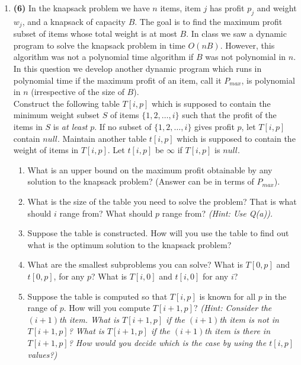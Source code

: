 \documentclass[10pt]{article}
\begin{document}
\begin{enumerate}
\item {\bf (6)}
In the knapsack problem we have $n$ items, item $j$ has profit $p_j$ and weight $w_j$, and a knapsack of capacity $B$.
The goal is to find the maximum profit subset of items whose total weight is at most $B$.
In class we saw a dynamic program to solve the knapsack problem in time $O(nB)$. 
However, this algorithm was not a polynomial time algorithm if $B$ was not polynomial in $n$.
In this question we develop another dynamic program which runs in polynomial time if the maximum profit of an item, call it $P_{max}$, is polynomial in $n$ (irrespective of the size of $B$).\\

Construct the following table $T[i,p]$ which is supposed to contain the minimum weight subset $S$ of items $\{1,2,\ldots,i\}$ such that
the profit of the items in $S$ is {\em at least} $p$. If no subset of $\{1,2,\ldots,i\}$ gives profit $p$, let $T[i,p]$ contain $null$.
Maintain another table $t[i,p]$ which is supposed to contain the weight of items in $T[i,p]$. Let $t[i,p]$ be $\infty$ if $T[i,p]$ is $null$.

	\begin{enumerate}
	\item What is an upper bound on the maximum profit obtainable by any solution to the knapsack problem? (Answer can be
		in terms of $P_{max}$).
	\item What is the size of the table you need to solve the problem? That is what should $i$ range from? What should $p$ range from?
	         {\em (Hint: Use Q(a)).}
	\item Suppose the table is constructed. How will you use the table to find out what is the optimum solution to the knapsack problem?
	\item What are the smallest subproblems you can solve? What is $T[0,p]$ and $t[0,p]$, for any $p$? What is $T[i,0]$ and $t[i,0]$ for any $i$?
	\item Suppose the table is computed so that $T[i,p]$ is known for all $p$ in the range of $p$. How will you compute $T[i+1,p]$?
	         {\em (Hint: Consider the $(i+1)$th item. What is $T[i+1,p]$ if the $(i+1)$th item is not in $T[i+1,p]$? What is $T[i+1,p]$ if the $(i+1)$th item
	          is there in $T[i+1,p]$? How would you decide which is the case by using the $t[i,p]$ values?)}
	\end{enumerate}
	
\end{enumerate}
\end{document}
